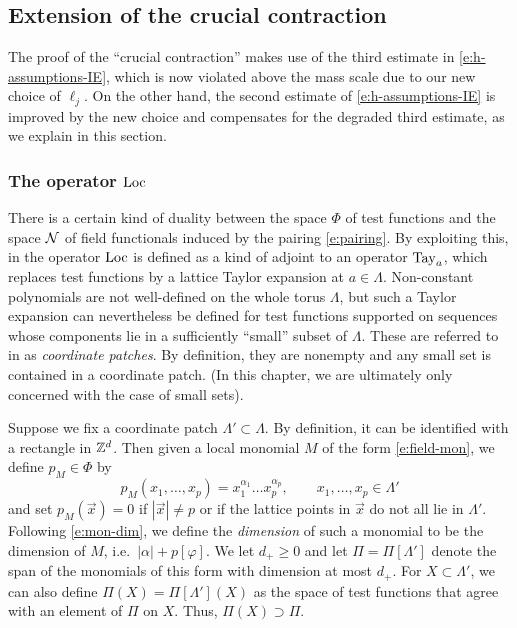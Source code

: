 
\subsection{Extension of the crucial contraction}
\label{sec:cc}

The proof of the ``crucial contraction''
\cite[Proposition \ref{IE-prop:cl}]{BS-rg-IE}
makes use of the  third estimate in
\eqref{e:h-assumptions-IE}, which is now violated above the mass scale
due to our new choice of $\ell_j$.
On the other hand, the second estimate of \eqref{e:h-assumptions-IE} is
improved by the new choice and compensates for the degraded third estimate,
as we explain in this section.

\subsubsection{The operator $\operatorname{Loc}$}

There is a certain kind of duality between the space $\Phi$ of test functions
and the space $\mathcal{N}$ of field functionals induced by the pairing \eqref{e:pairing}.
By exploiting this,
in \cite{BS-rg-IE} the operator $\operatorname{Loc}$ is defined as a kind of adjoint to
an operator ${\rm Tay}_a$, which replaces test functions by a lattice Taylor expansion
at $a\in\Lambda$.
Non-constant polynomials are not well-defined on the whole torus $\Lambda$, but
such a Taylor expansion can nevertheless be defined for test functions supported
on sequences whose components lie in a sufficiently ``small'' subset of $\Lambda$.
These are referred to in \cite{BS-rg-IE} as \emph{coordinate patches}. By definition,
they are nonempty and any small set is contained in a coordinate patch.
(In this chapter, we are ultimately only concerned with the case of small sets).


Suppose we fix a coordinate patch $\Lambda' \subset \Lambda$. By definition, it
can be identified with a rectangle in ${ {{\mathbb Z}}^d }$.
Then given a local monomial $M$ of the form \eqref{e:field-mon},
we define $p_M\in\Phi$ by
\begin{equation}
\label{e:lattice-mon}
p_M(x_1, \ldots, x_p)
	=
x_1^{\alpha_1} \ldots x_p^{\alpha_p},
	\qquad
x_1, \ldots, x_p \in \Lambda'
\end{equation}
and set $p_M(\vec x) = 0$ if $|\vec x| \ne p$ or if the lattice points in $\vec x$
do not all lie in $\Lambda'$. Following \eqref{e:mon-dim},
we define the \emph{dimension} of such a monomial to be the dimension of $M$,
i.e.\ $|\alpha| + p [\varphi]$.
We let $d_+ \ge 0$ and let $\Pi = \Pi[\Lambda']$ denote the span of the monomials
of this form with dimension at most $d_+$. For $X \subset \Lambda'$, we can also define
$\Pi(X) = \Pi[\Lambda'](X)$ as the space of test functions that agree with an element
of $\Pi$ on $X$. Thus, $\Pi(X) \supset \Pi$.


